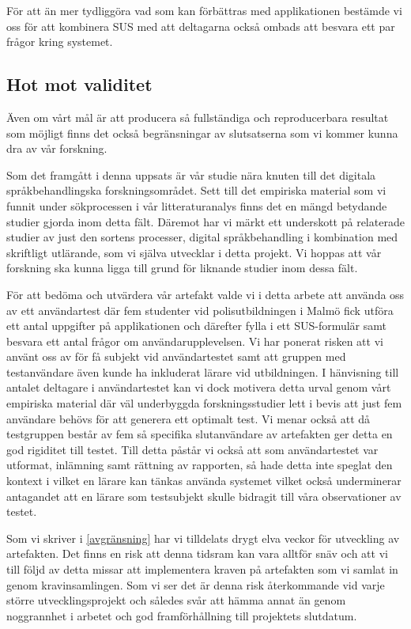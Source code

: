 \documentclass[swedish]{maucsthesis}
\begin{document}
För att än mer tydliggöra vad som kan förbättras med applikationen bestämde vi
oss för att kombinera SUS med att deltagarna också ombads att besvara ett par
frågor kring systemet.

\subsection{Hot mot validitet}

Även om vårt mål är att producera så fullständiga och reproducerbara resultat
som möjligt finns det också begränsningar av slutsatserna som vi kommer kunna
dra av vår forskning.

Som det framgått i denna uppsats är vår studie nära knuten till det
digitala språkbehandlingska forskningsområdet. Sett till det empiriska material som vi
funnit under sökprocessen i vår litteraturanalys finns det en mängd betydande
studier gjorda inom detta fält. Däremot har vi märkt ett underskott på
relaterade studier av just den sortens processer, digital språkbehandling i kombination
med skriftligt utlärande, som vi själva utvecklar i detta projekt. Vi
hoppas att vår forskning ska kunna ligga till grund för liknande studier inom
dessa fält.

För att bedöma och utvärdera vår artefakt valde vi i detta arbete att använda
oss av ett användartest där fem studenter vid polisutbildningen i Malmö fick
utföra ett antal uppgifter på applikationen och därefter fylla i ett
SUS-formulär samt besvara ett antal frågor om användarupplevelsen. Vi har
ponerat risken att vi använt oss av för få subjekt vid användartestet samt
att gruppen med testanvändare även kunde ha inkluderat lärare vid utbildningen.
I hänvisning till antalet deltagare i användartestet kan vi dock motivera detta
urval genom vårt empiriska material där väl underbyggda forskningsstudier lett i
bevis att just fem användare behövs för att generera ett optimalt test. Vi menar
också att då testgruppen består av fem så specifika slutanvändare av artefakten
ger detta en god rigiditet till testet. Till detta påstår vi också att som
användartestet var utformat, inlämning samt rättning av rapporten, så hade detta
inte speglat den kontext i vilket en lärare kan tänkas använda systemet vilket
också underminerar antagandet att en lärare som testsubjekt skulle bidragit till
våra observationer av testet.

Som vi skriver i \cref{avgränsning} har vi tilldelats drygt elva veckor
för utveckling av artefakten. Det finns en risk att denna tidsram kan vara
alltför snäv och att vi till följd av detta missar att implementera kraven på
artefakten som vi samlat in genom kravinsamlingen. Som vi ser det är denna risk
återkommande vid varje större utvecklingsprojekt och således svår att hämma
annat än genom noggrannhet i arbetet och god framförhållning till projektets
slutdatum.
\end{document}
